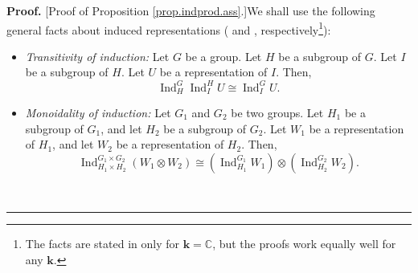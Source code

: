 \documentclass[numbers=enddot,12pt,final,onecolumn,notitlepage]{scrartcl}%
\theoremstyle{definition}
\newenvironment{proof}[1][Proof]{\noindent\textbf{#1.} }{\ \rule{0.5em}{0.5em}}
\begin{document}
\begin{proof}
[Proof of Proposition \ref{prop.indprod.ass}.]We shall use the following
general facts about induced representations (\cite[Exercise 4.1.2]{GriRei} and
\cite[Exercise 4.1.3]{GriRei}, respectively\footnote{The facts are stated in
\cite{GriRei} only for $\mathbf{k}=\mathbb{C}$, but the proofs work equally
well for any $\mathbf{k}$.}):

\begin{itemize}
\item \textit{Transitivity of induction:} Let $G$ be a group. Let $H$ be a
subgroup of $G$. Let $I$ be a subgroup of $H$. Let $U$ be a representation of
$I$. Then,
\begin{equation}
\operatorname*{Ind}\nolimits_{H}^{G}\operatorname*{Ind}\nolimits_{I}^{H}%
U\cong\operatorname*{Ind}\nolimits_{I}^{G}U. \label{pf.prop.indprod.ass.trind}%
\end{equation}


\item \textit{Monoidality of induction:} Let $G_{1}$ and $G_{2}$ be two
groups. Let $H_{1}$ be a subgroup of $G_{1}$, and let $H_{2}$ be a subgroup of
$G_{2}$. Let $W_{1}$ be a representation of $H_{1}$, and let $W_{2}$ be a
representation of $H_{2}$. Then,%
\begin{equation}
\operatorname*{Ind}\nolimits_{H_{1}\times H_{2}}^{G_{1}\times G_{2}}\left(
W_{1}\otimes W_{2}\right)  \cong\left(  \operatorname*{Ind}\nolimits_{H_{1}%
}^{G_{1}}W_{1}\right)  \otimes\left(  \operatorname*{Ind}\nolimits_{H_{2}%
}^{G_{2}}W_{2}\right)  . \label{pf.prop.indprod.ass.mind}%
\end{equation}

\end{itemize}


\end{proof}
\end{document}
